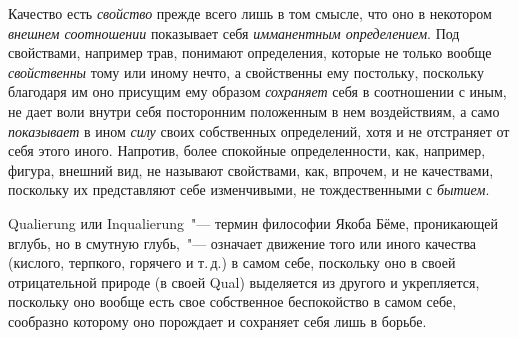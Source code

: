 Качество есть \emph{свойство} прежде всего лишь в том
смысле, что оно в некотором \emph{внешнем соотношении} показывает
себя \emph{имманентным определением}. Под свойствами,
например трав, понимают определения, которые
не только вообще \emph{свойственны} тому или иному нечто,
а свойственны ему постольку, поскольку благодаря им
оно присущим ему образом \emph{сохраняет} себя в соотношении
с иным, не дает воли внутри себя посторонним
положенным в нем воздействиям, а само \emph{показывает} в
ином \emph{силу} своих собственных определений, хотя и не
отстраняет от себя этого иного. Напротив, более спокойные
определенности, как, например, фигура, внешний вид,
не называют свойствами, как, впрочем, и не качествами,
поскольку их представляют себе изменчивыми, не тождественными
с \emph{бытием}.

Qualierung или Inqualierung~"--- термин философии
Якоба Бёме, проникающей вглубь, но в смутную глубь,~"---
означает движение того или иного качества (кислого,
терпкого, горячего и т.\,д.) в самом себе, поскольку оно
в своей отрицательной природе (в своей Qual\endnotemark{}) выделяется
из другого и укрепляется, поскольку оно вообще
есть свое собственное беспокойство в самом себе, сообразно
которому оно порождает и сохраняет себя лишь
в борьбе.



